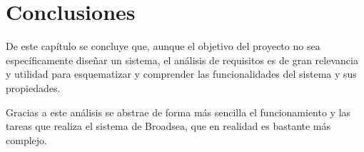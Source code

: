 \section{Conclusiones} \label{sec:06conclusiones}

De este capítulo se concluye que, aunque el objetivo del proyecto no sea específicamente diseñar un sistema, el análisis de requisitos es de gran relevancia y utilidad  para esquematizar y comprender las funcionalidades del sistema y sus propiedades.

Gracias a este análisis se abstrae de forma más sencilla el funcionamiento y las tareas que realiza el sistema de Broadsea, que en realidad es bastante más complejo.
